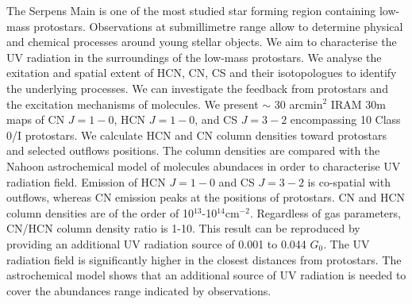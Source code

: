 \documentclass{aa}
\begin{document}
  \abstract
   {The Serpens Main is one of the most studied star forming region containing low-mass protostars. Observations at submillimetre range allow to determine physical and chemical processes around young stellar objects.} %
   {We aim to characterise the UV radiation in the surroundings of the low-mass protostars. We analyse the exitation and spatial extent of HCN, CN, CS and their isotopologues to identify the underlying processes. We can investigate the feedback from protostars and the excitation mechanisms of molecules. }
   {We present $ \sim $ 30 arcmin$^2$ IRAM 30m maps of CN $J=1-0$, HCN $J=1-0$, and CS $J=3-2$ encompassing 10 Class 0/I protostars. We calculate HCN and CN column densities toward protostars and selected outflows positions. The column densities are compared with the Nahoon astrochemical model of molecules abundaces in order to characterise UV radiation field.}
   {Emission of HCN $J=1-0$ and CS $J=3-2$ is co-spatial with outflows, whereas CN emission peaks at the positions of protostars. CN and HCN column densities are of the order of 10$^{13}$-10$^{14}$cm$^{-2}$. Regardless of gas parameters, CN/HCN column density ratio is 1-10. This result can be reproduced by providing an additional UV radiation source of 0.001 to 0.044 $G_0$.}
   {The UV radiation field is significantly higher in the closest distances from protostars. The astrochemical model shows that an additional source of UV radiation is needed to cover the abundances range indicated by observations.}


   \maketitle
%
\end{document}
